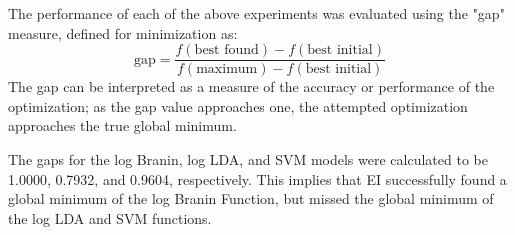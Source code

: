 \documentclass[11pt]{article}
\numberwithin{equation}{section}
\begin{document}
The performance of each of the above experiments was evaluated using the "gap" measure, defined for minimization as:
\begin{equation}
  \text{gap} = \dfrac{f(\text{best found}) - f(\text{best initial})}{f(\text{maximum}) - f(\text{best initial})}
  \label{eq:gap}
\end{equation}
The gap can be interpreted as a measure of the accuracy or performance of the optimization; as the gap value approaches one, the attempted optimization approaches the true global minimum. 

The gaps for the log Branin, log LDA, and SVM models were calculated to be 1.0000, 0.7932, and 0.9604, respectively. 
This implies that EI successfully found a global minimum of the log Branin Function, but missed the global minimum of the log LDA and SVM functions.
\end{document}
